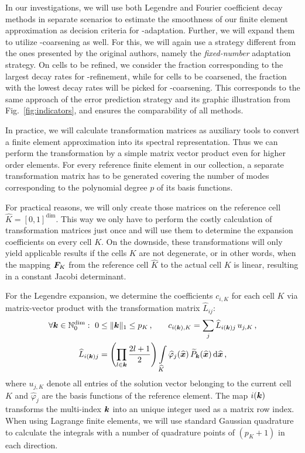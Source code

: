 In our investigations, we will use both Legendre and Fourier coefficient decay methods in separate scenarios to estimate the smoothness of our finite element approximation as decision criteria for \hp-adaptation. Further, we will expand them to utilize \hp-coarsening as well. For this, we will again use a strategy different from the ones presented by the original authors, namely the \textit{fixed-number} adaptation strategy. On cells to be refined, we consider the fraction corresponding to the largest decay rates for \p-refinement, while for cells to be coarsened, the fraction with the lowest decay rates will be picked for \p-coarsening. This corresponds to the same approach of the error prediction strategy and its graphic illustration from Fig.~\ref{fig:indicators}, and ensures the comparability of all methods.

In practice, we will calculate transformation matrices as auxiliary tools to convert a finite element approximation into its spectral representation. Thus we can perform the transformation by a simple matrix vector product even for higher order elements. For every reference finite element in our collection, a separate transformation matrix has to be generated covering the number of modes corresponding to the polynomial degree $p$ of its basis functions.

For practical reasons, we will only create those matrices on the reference cell $\widehat{K} = [0,1]^\text{dim}$. This way we only have to perform the costly calculation of transformation matrices just once and will use them to determine the expansion coefficients on every cell $K$. On the downside, these transformations will only yield applicable results if the cells $K$ are not degenerate, or in other words, when the mapping $\mat{F}_K$ from the reference cell $\widehat{K}$ to the actual cell $K$ is linear, resulting in a constant Jacobi determinant.

For the Legendre expansion, we determine the coefficients $c_{i,K}$ for each cell $K$ via matrix-vector product with the transformation matrix $\widehat{L}_{ij}$:
\begin{gather}
\forall \tuple{k} \in \mathbb{N}_0^\text{dim} : ~ 0 \leq \|\tuple{k}\|_1 \leq p_K \,\text{,} \qquad
c_{i(\tuple{k}),K} = \sum\limits_j \widehat{L}_{i(\tuple{k})j} \, u_{j,K} \,\text{,} \\
\widehat{L}_{i(\tuple{k})j} = \left(\prod\limits_{l \in \tuple{k}} \frac{2l+1}{2}\right) \int\limits_{\widehat{K}} \widehat{\varphi}_j(\vec{\widehat{x}}) \, \widetilde{P}_\tuple{k}(\vec{\widehat{x}}) \differential{\vec{\widehat{x}}} \,\text{,}
\end{gather}
where $u_{j,K}$ denote all entries of the solution vector belonging to the current cell $K$ and $\widehat{\varphi}_j$ are the basis functions of the reference element. The map $i(\tuple{k})$ transforms the multi-index $\tuple{k}$ into an unique integer used as a matrix row index. When using Lagrange finite elements, we will use standard Gaussian quadrature to calculate the integrals with a number of quadrature points of $(p_K + 1)$ in each direction.

